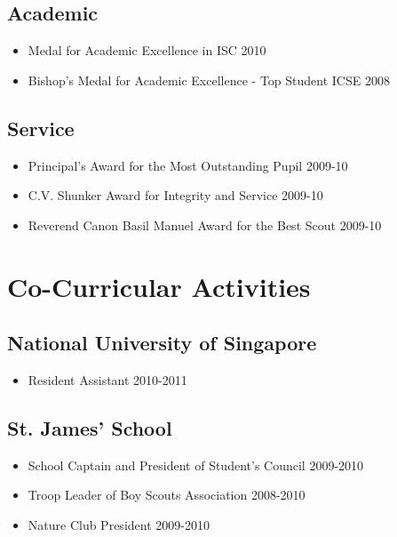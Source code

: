\documentclass[11pt,a4paper]{moderncv}
\begin{document}
\subsection{Academic}
\begin{itemize}
\item Medal for Academic Excellence in ISC \hfill 2010
\item Bishop’s Medal for Academic Excellence - Top Student ICSE \hfill 2008
\end{itemize}
\subsection{Service}
\begin{itemize}
\item Principal’s Award for the Most Outstanding Pupil \hfill 2009-10
\item C.V. Shunker Award for Integrity and Service \hfill 2009-10
\item Reverend Canon Basil Manuel Award for the Best Scout \hfill 2009-10
\end{itemize}
\section{Co-Curricular Activities}
\subsection{National University of Singapore}
\begin{itemize}
    \item Resident Assistant \hfill 2010-2011
\end{itemize}
\subsection{St. James’ School}
\begin{itemize}
\item School Captain and President of Student’s Council \hfill 2009-2010
\item Troop Leader of Boy Scouts Association \hfill 2008-2010
\item Nature Club President \hfill 2009-2010
\end{itemize}
\textbf{}
\end{document}
